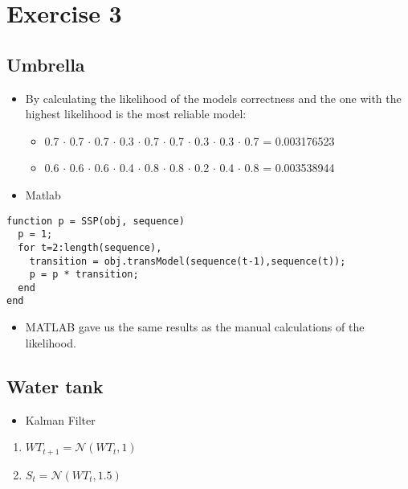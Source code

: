 \documentclass[colorlinks=true,linkcolor=blue]{article}
\begin{document}
\section{Exercise 3}
\label{sec-3}
\subsection{Umbrella}
\label{sec-3-1}
\begin{itemize}
\item By calculating the likelihood of the models correctness and the one with the highest likelihood is the most reliable model:
\begin{itemize}
\item 0.7 $\cdot$ 0.7 $\cdot$ 0.7 $\cdot$ 0.3 $\cdot$ 0.7 $\cdot$ 0.7 $\cdot$ 0.3 $\cdot$ 0.3 $\cdot$ 0.7 = 0.003176523
\item 0.6 $\cdot$ 0.6 $\cdot$ 0.6 $\cdot$ 0.4 $\cdot$ 0.8 $\cdot$ 0.8 $\cdot$ 0.2 $\cdot$ 0.4 $\cdot$ 0.8 = 0.003538944
\end{itemize}
\item Matlab
\end{itemize}
\begin{verbatim}
function p = SSP(obj, sequence)
  p = 1;
  for t=2:length(sequence),
    transition = obj.transModel(sequence(t-1),sequence(t));
    p = p * transition;                
  end
end
\end{verbatim}
\begin{itemize}
\item MATLAB gave us the same results as the manual calculations of the likelihood.
\end{itemize}


\subsection{Water tank}
\label{sec-3-2}
\begin{itemize}
\item Kalman Filter
\end{itemize}
\begin{enumerate}
\item $WT_{t+1} = \mathcal{N}(WT_t,1)$
\item $S_t = \mathcal{N}(WT_t,1.5)$
\end{enumerate}
\end{document}

